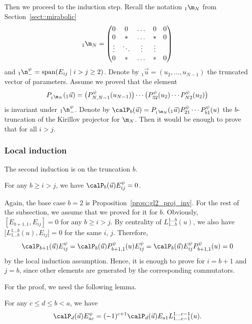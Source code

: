 	Then we proceed to the induction step. Recall the notation ${}_1\m_N$ from Section~\ref{sect::mirabolic}
	\begin{equation}
		\label{eq::mirabolic_lower_corner}
		{}_1\m_{N} =
		\begin{pmatrix}
			0 & 0 &\dots & 0 & 0 \\
			0 & * & \dots & * & 0 \\
			\vdots & \ddots & \vdots & \vdots \\
			0 & * & \dots & * & 0
		\end{pmatrix}
	\end{equation}
	and ${}_1\n_-^{\psi} = \mathrm{span}(E_{ij} \mid i > j \geq 2)$. Denote by ${}_1\vec{u} = (u_2,\dots,u_{N-1})$ the truncated vector of parameters. Assume we proved that the element
	\[
	P_{{}_1\m_N}({}_1\vec{u}) = \bigl(P_{N,N-1}^{\psi}(u_{N-1}) \bigr) \cdots \bigl(P_{32}^{\psi}(u_2) \cdots P_{N2}^{\psi}(u_2) \bigr)
	\]
	is invariant under ${}_1 \n_-^{\psi}$. Denote by
$
	\calP_b(\vec{u}) = P_{{}_1\m_N}({}_1\vec{u})P_{21}^{\psi} \cdots P_{b1}^{\psi}(u)
$
	the $b$-truncation of the Kirillov projector for $\m_N$. Then it would be enough to prove that
	for all $i>j$.
	
	\subsubsection{Local induction}
	The second induction is on the truncation $b$.
	\begin{Proposition}
		\label{prop::local_ind}
		For any $b \geq i > j$, we have
		$
		\calP_b(\vec{u}) E^{\psi}_{ij} = 0$.
	\end{Proposition}
	Again, the base case $b=2$ is Proposition~\ref{prop::gl2_proj_inv}. For the rest of the subsection, we assume that we proved for it for $b$. Obviously, $[E_{b+1,1},E_{ij}]=0$ for any $b\geq i > j$. By centrality of $L_{1\dots b}^{1\dots b}(u)$, we also have $\bigl[L_{1\dots b}^{1\dots b}(u),E_{ij}\bigr]=0$ for the same $i$, $j$. Therefore,
	\[
	\calP_{b+1}(\vec{u}) E^{\psi}_{ij} = \calP_{b}(\vec{u}) P_{b+1,1}^{\psi}(u) E^{\psi}_{ij} = \calP_{b}(\vec{u}) E_{ij}^{\psi} P_{b+1,1}^{\psi}(u) = 0
	\]
	by the local induction assumption. Hence, it is enough to prove for $i=b+1$ and $j=b$, since other elements are generated by the corresponding commutators.
	
	For the proof, we need the following lemma.
	\begin{Lemma}
		\label{lm::nilp_to_minor}
		For any $c\leq d \leq b < a$, we have
		\[
		\calP_d(\vec{u}) E_{ac}^{\psi} = (-1)^{c+1} \calP_d(\vec{u}) E_{a1} L_{1\dots c-1}^{1\dots c-1}(u).
		\]
	\end{Lemma}
	
